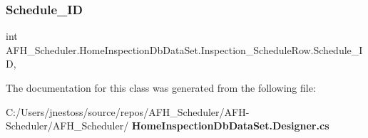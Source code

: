 \mbox{\label{class_a_f_h___scheduler_1_1_home_inspection_db_data_set_1_1_inspection___schedule_row_ada5da1df7bfed4f3f3c23484a64d4b93}} 
\subsubsection{Schedule\_ID}
{\footnotesize\ttfamily int A\+F\+H\+\_\+\+Scheduler.\+Home\+Inspection\+Db\+Data\+Set.\+Inspection\+\_\+\+Schedule\+Row.\+Schedule\+\_\+\+ID\hspace{0.3cm}{\ttfamily [get]}, {\ttfamily [set]}}



The documentation for this class was generated from the following file\+:\begin{DoxyCompactItemize}
\item 
C\+:/\+Users/jnestoss/source/repos/\+A\+F\+H\+\_\+\+Scheduler/\+A\+F\+H-\/\+Scheduler/\+A\+F\+H\+\_\+\+Scheduler/\textbf{ Home\+Inspection\+Db\+Data\+Set.\+Designer.\+cs}\end{DoxyCompactItemize}
